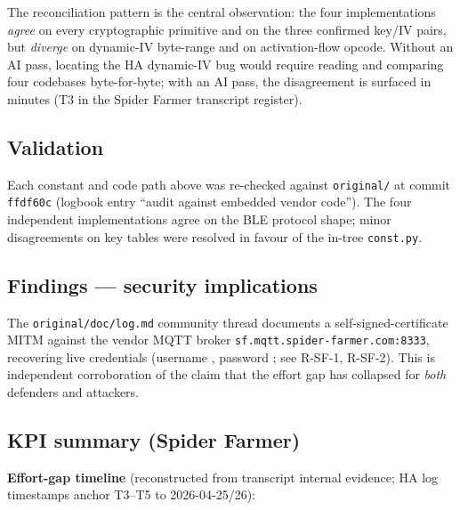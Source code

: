 \documentclass[11pt,a4paper]{article}
\newcommand{\fp}[1]{\path{#1}}
\begin{document}
The reconciliation pattern is the central observation: the four
implementations \emph{agree} on every cryptographic primitive and on the
three confirmed key/IV pairs, but \emph{diverge} on dynamic-IV byte-range
and on activation-flow opcode. Without an AI pass, locating the HA
dynamic-IV bug would require reading and comparing four codebases
byte-for-byte; with an AI pass, the disagreement is surfaced in minutes
(T3 in the Spider Farmer transcript register).

\subsection{Validation}
\label{sec:sf-validation}
Each constant and code path above was re-checked against
\texttt{original/} at commit \texttt{ffdf60c} (logbook entry ``audit against
embedded vendor code''). The four independent implementations agree on the
BLE protocol shape; minor disagreements on key tables were resolved in
favour of the in-tree \texttt{const.py}.

\subsection{Findings --- security implications}
\label{sec:sf-security}
The \texttt{original/doc/log.md} community thread documents a
self-signed-certificate MITM against the vendor MQTT broker
\texttt{sf.mqtt.spider-farmer.com:8333}, recovering live credentials
(username , password
; see
\fp{docs/redaction-policy.md} R-SF-1, R-SF-2). This is independent
corroboration of the claim that the effort gap has collapsed for
\emph{both} defenders and attackers.

\subsection{KPI summary (Spider Farmer)}
\label{sec:sf-kpis}

\textbf{Effort-gap timeline} (reconstructed from transcript internal evidence;
HA log timestamps anchor T3--T5 to 2026-04-25/26):
\end{document}
